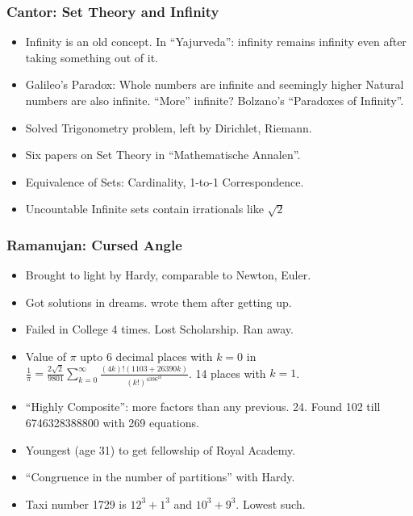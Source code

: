 \begin{frame}[fragile]
\frametitle{Cantor: Set Theory and Infinity}
\begin{itemize}
\item Infinity is an old concept. In ``Yajurveda'': infinity remains infinity even after taking something out of it.
\item Galileo's Paradox: Whole numbers are infinite and seemingly higher Natural numbers are also infinite. ``More'' infinite? Bolzano's ``Paradoxes of Infinity''.
\item Solved Trigonometry problem, left by Dirichlet, Riemann.
\item Six papers on Set Theory in ``Mathematische  Annalen''.
\item Equivalence of Sets: Cardinality, 1-to-1 Correspondence.
\item Uncountable Infinite sets contain irrationals like $\sqrt 2$
\end{itemize}
\end{frame}

\begin{frame}[fragile]
\frametitle{Ramanujan: Cursed Angle}
\begin{itemize}
\item Brought to light by Hardy, comparable to Newton, Euler.
\item Got solutions in dreams. wrote them after getting up.
\item Failed in College 4 times. Lost Scholarship. Ran away.
\item Value of $\pi$ upto 6 decimal places with $k=0$ in $\frac{1}{\pi} = \frac{2\sqrt 2}{9801} \sum \limits_{k=0}^{\infty} \frac{(4k)!(1103+26390k)}{(k!)^4396^{4k}}$. 14 places with $k=1$.
\item ``Highly Composite'': more factors than any previous. 24. Found 102 till 6746328388800 with 269 equations.
\item Youngest (age 31) to get fellowship of Royal Academy.
\item ``Congruence in the number of partitions'' with Hardy.
\item Taxi number 1729 is $12^3+1^3$ and  $10^3+9^3$. Lowest such.
\end{itemize}
\end{frame}


